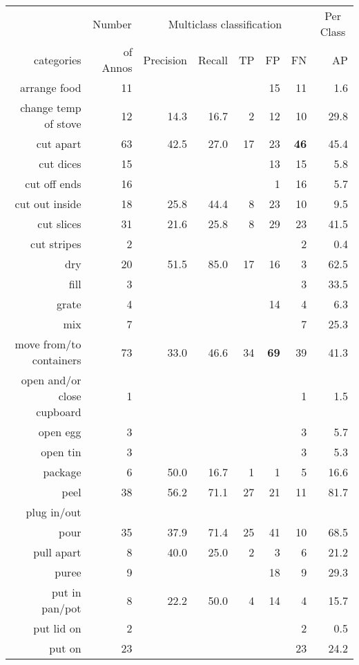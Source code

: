 \begin{tabular}{r r r@{\ \ }r@{\ \ }r@{\ \ }r@{\ \ }r r}
\toprule  & \multicolumn{1}{c}{Number}  & \multicolumn{5}{c}{Multiclass classification}  & \multicolumn{1}{c}{Per Class} \\
categories&of Annos&Precision&Recall&TP&FP&FN&AP\\
\cmidrule(lr){1-1} \cmidrule(lr){2-2} \cmidrule(lr){3-7} \cmidrule(lr){8-8}
arrange food & 11 &  &  &  & 15 & 11 & 1.6 \\
change temp of stove & 12 & 14.3 & 16.7 & 2 & 12 & 10 & 29.8 \\
cut apart & 63 & 42.5 & 27.0 & 17 & 23 & \textbf{46} & 45.4 \\
cut dices & 15 &  &  &  & 13 & 15 & 5.8 \\
cut off ends & 16 &  &  &  & 1 & 16 & 5.7 \\
cut out inside & 18 & 25.8 & 44.4 & 8 & 23 & 10 & 9.5 \\
cut slices & 31 & 21.6 & 25.8 & 8 & 29 & 23 & 41.5 \\
cut stripes & 2 &  &  &  &  & 2 & 0.4 \\
dry & 20 & 51.5 & 85.0 & 17 & 16 & 3 & 62.5 \\
fill & 3 &  &  &  &  & 3 & 33.5 \\
grate & 4 &  &  &  & 14 & 4 & 6.3 \\
mix & 7 &  &  &  &  & 7 & 25.3 \\
move from/to containers & 73 & 33.0 & 46.6 & 34 & \textbf{69} & 39 & 41.3 \\
open and/or close cupboard & 1 &  &  &  &  & 1 & 1.5 \\
open egg & 3 &  &  &  &  & 3 & 5.7 \\
open tin & 3 &  &  &  &  & 3 & 5.3 \\
package & 6 & 50.0 & 16.7 & 1 & 1 & 5 & 16.6 \\
peel & 38 & 56.2 & 71.1 & 27 & 21 & 11 & 81.7 \\
plug in/out &  &  &  &  &  &  &  \\
pour & 35 & 37.9 & 71.4 & 25 & 41 & 10 & 68.5 \\
pull apart & 8 & 40.0 & 25.0 & 2 & 3 & 6 & 21.2 \\
puree & 9 &  &  &  & 18 & 9 & 29.3 \\
put in pan/pot & 8 & 22.2 & 50.0 & 4 & 14 & 4 & 15.7 \\
put lid on & 2 &  &  &  &  & 2 & 0.5 \\
put on & 23 &  &  &  &  & 23 & 24.2 \\

\end{tabular}
